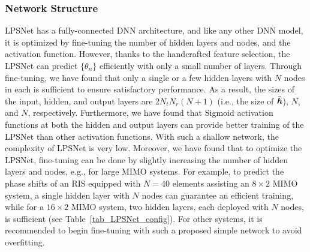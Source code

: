 \documentclass[conference]{IEEEtran}
\begin{document}
	
	\subsubsection{Network Structure}

	 LPSNet has a fully-connected DNN architecture, and like any other DNN model, it is optimized by fine-tuning the number of hidden layers and nodes, and the activation function. However, thanks to the handcrafted feature selection, the LPSNet can predict $\{ \theta_n \}$ efficiently with only a small number of layers. Through fine-tuning, we have found that only a single or a few hidden layers with $N$ nodes in each is sufficient to ensure satisfactory performance. As a result, the sizes of the input, hidden, and output layers are $2N_tN_r(N+1)$ (i.e., the size of $\bar{\textbf{\textit{h}}}$), $N$, and $N$, respectively. Furthermore, we have found that Sigmoid activation functions at both the hidden and output layers can provide better training of the LPSNet than other activation functions. With such a shallow network, the complexity of LPSNet is very low. Moreover, we have found that to optimize the LPSNet, fine-tuning can be done by slightly increasing the number of hidden layers and nodes, e.g., for large MIMO systems. For example, to predict the phase shifts of an RIS equipped with $N=40$ elements assisting an $8 \times 2$ MIMO system, a single hidden layer with $N$ nodes can guarantee an efficient training, while for a $16 \times 2$ MIMO system, two hidden layers, each deployed with $N$ nodes, is sufficient (see Table~\ref{tab_LPSNet_config}). For other systems, it is recommended to begin fine-tuning with such a proposed simple network to avoid overfitting.
	
\end{document}
